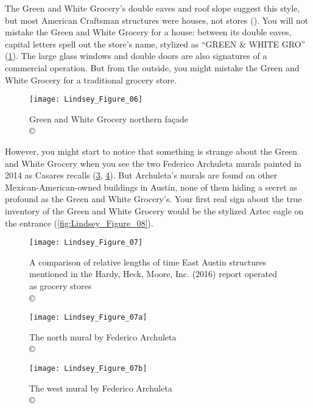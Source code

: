 The Green and White Grocery's double eaves and roof slope suggest this style, but most American Craftsman structures were houses, not stores (\cite{robinson}). You will not mistake the Green and White Grocery for a house: between its double eaves, capital letters spell out the store's name, stylized as “GREEN \& WHITE GRO” (\cref{fig:Lindsey_Figure_06}). The large glass windows and double doors are also signatures of a commercial operation. But from the outside, you might mistake the Green and White Grocery for a traditional grocery store.

\begin{figure}[!tb]
	\texttt{[image: Lindsey\_Figure\_06]}
	\caption{Green and White Grocery northern façade\\
		{\normalfont\scriptsize \copyright\
			\shortauthor
	}}
	\label{fig:Lindsey_Figure_06}
\end{figure}

However, you might start to notice that something is strange about the Green and White Grocery when you see the two Federico Archuleta murals painted in 2014 as Casares recalls (\cref{fig:Lindsey_Figure_07a}, \cref{fig:Lindsey_Figure_07b}). But Archuleta's murals are found on other Mexican-American-owned buildings in Austin, none of them hiding a secret as profound as the Green and White Grocery's. Your first real sign about the true inventory of the Green and White Grocery would be the stylized Aztec eagle on the entrance (\cref{fig:Lindsey_Figure_08}).

\begin{figure}[!tb]
	\texttt{[image: Lindsey\_Figure\_07]}
	\caption{A comparison of relative lengths of time East Austin structures mentioned in the Hardy, Heck, Moore, Inc. (2016) report operated as grocery stores\\
		{\normalfont\scriptsize \copyright\
			\shortauthor
	}}
	\label{fig:Lindsey_Figure_07}
\end{figure}


\begin{figure}[!tb]
	\texttt{[image: Lindsey\_Figure\_07a]}
	\caption{The north mural by Federico Archuleta\\
		{\normalfont\scriptsize \copyright\
			\shortauthor
	}}
	\label{fig:Lindsey_Figure_07a}
\end{figure}

\begin{figure}[!tb]
	\texttt{[image: Lindsey\_Figure\_07b]}
	\caption{The west mural by Federico Archuleta\\
		{\normalfont\scriptsize \copyright\
			\shortauthor
	}}
	\label{fig:Lindsey_Figure_07b}
\end{figure}

